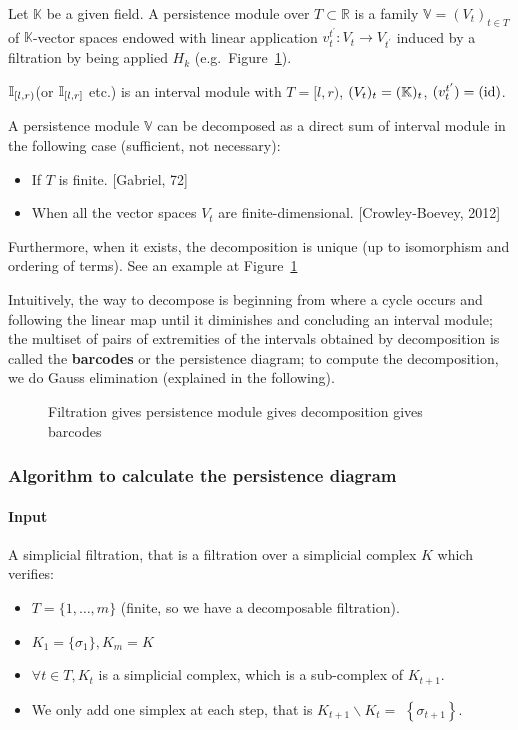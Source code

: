 \begin{definition}
  Let $\mathbb{K}$ be a given field. A persistence module over $T \subset \mathbb{R}$ is a family $\mathbb{V}=\left(V_t\right)_{t \in T}$ of $\mathbb{K}$-vector spaces
  endowed with linear application $v_t^{t^{\prime}}: V_t \rightarrow V_{t^{\prime}}$ induced by
  a filtration by being applied $H_k$ (e.g.\ Figure~\ref{fig:tda_diagram}).

  $\mathbb{I}_{[l, r)}$(or $\mathbb{I}_{[l, r]}$ etc.) is an interval module with $T = [l, r)$,
  $(V_t)_t = (\mathbb{K})_t$, $(v^{t'}_t) = (\operatorname{id})$.
\end{definition}

\begin{theorem}
  A persistence module $\mathbb{V}$ can be decomposed as a direct sum of interval module
  in the following case (sufficient, not necessary):
  \begin{itemize}
    \item If $T$ is finite. [Gabriel, 72]
    \item When all the vector spaces $V_t$ are finite-dimensional. [Crowley-Boevey, 2012]
  \end{itemize}
  Furthermore, when it exists, the decomposition is unique (up to isomorphism and ordering of terms).
  See an example at Figure~\ref{fig:tda_diagram}
\end{theorem}

\RM Intuitively, the way to decompose is beginning from where a cycle occurs
and following the linear map until it diminishes and concluding an interval module;
the multiset of pairs of extremities of the intervals obtained by decomposition is called the \textbf{barcodes}
or the persistence diagram; to compute the decomposition, we do Gauss elimination (explained in the following).

\begin{figure}[htbp]
\centering

\caption{Filtration gives persistence module gives decomposition gives barcodes}
\label{fig:tda_diagram}
\end{figure}

\subsubsection{Algorithm to calculate the persistence diagram}

\paragraph{Input} A simplicial filtration, that is a filtration over a simplicial complex $K$ which verifies:
\begin{itemize}
  \item $T=\{1, \ldots, m\}$ (finite, so we have a decomposable filtration).
  \item $K_1=\{\sigma_1\}, K_m = K$
  \item $\forall t \in T, K_t$ is a simplicial complex,
  which is a sub-complex of $K_{t+1}$.
  \item We only add one simplex at each step,
  that is $K_{t+1} \backslash K_t=$ $\left\{\sigma_{t+1}\right\}$.
\end{itemize}

